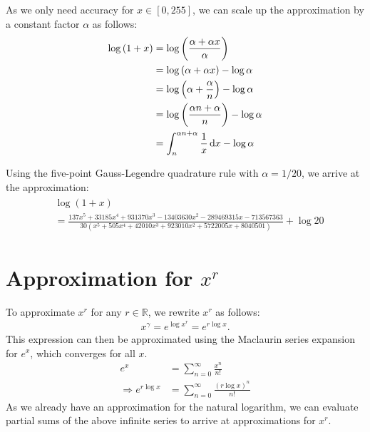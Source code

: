 As we only need accuracy for $x \in [0, 255]$, we can scale up the approximation by a constant factor $\alpha$ as follows:
\begin{align*}
  \log{(1+x)} &= \log{\left(\frac{\alpha + \alpha x}{\alpha}\right)}\\
  &= \log{(\alpha + \alpha x)} - \log{\alpha}\\
  &= \log{\left(\alpha+\frac{\alpha}{n}\right)} - \log{\alpha}\\
  &= \log{\left(\frac{\alpha n + \alpha}{n}\right)} - \log{\alpha}\\
  &= \int_{n}^{\alpha n + \alpha}{\frac{1}{x}\mathop{}\!\mathrm{d} x} - \log{\alpha}
\end{align*}

Using the five-point Gauss-Legendre quadrature rule with $\alpha = 1/20$, we arrive at the approximation:
\begin{align}\label{eq:scaledquadrature}
  \begin{split}
    &\log(1+x) \\
    &=\frac{137x^5 + 33185x^4 + 931370x^3 - 13403630x^2 - 289469315x - 713567363}
    {30(x^5 + 505x^4 + 42010x^3 + 923010x^2 + 5722005x + 8040501)} + \log{20}
  \end{split}
\end{align}

\section{Approximation for $x^r$}
To approximate $x^r$ for any $r \in \mathbb{R}$, we rewrite $x^r$ as follows:
\begin{align*}
  x^\gamma = e^{\log{x^r}} = e^{r\log{x}}.
\end{align*}
This expression can then be approximated using the Maclaurin series expansion for $e^x$, which converges for all $x$.
\begin{align*}
  e^x &= \sum_{n=0}^{\infty}{\frac{x^n}{n!}}\\
  \Rightarrow e^{r\log{x}} &= \sum_{n=0}^{\infty}{\frac{(r\log{x})^n}{n!}}
\end{align*}
As we already have an approximation for the natural logarithm, we can evaluate partial sums of the above infinite series to arrive at approximations for $x^r$.
